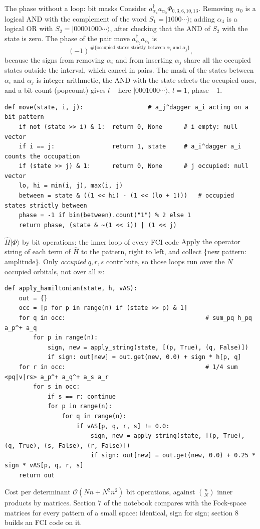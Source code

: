 \documentclass[aspectratio=169,10pt]{beamer}
\newcommand{\ket}[1]{\vert #1\rangle}
\begin{document}
\begin{frame}[fragile]{The phase without a loop: bit masks}
  \small
  Consider $a^{\dagger}_{\alpha_4}a_{\alpha_0}\Phi_{0,3,6,10,13}$. Removing $\alpha_0$ is a logical AND with the complement of the word $S_1=\ket{1000\cdots}$; adding $\alpha_4$ is a logical OR with $S_2=\ket{00001000\cdots}$, after checking that the AND of $S_2$ with the state is zero. The phase of the pair move $a^{\dagger}_{\alpha_j}a_{\alpha_i}$ is
  \[
    (-1)^{\,\#\{\text{occupied states strictly between }\alpha_i\text{ and }\alpha_j\}},
  \]
  because the signs from removing $\alpha_i$ and from inserting $\alpha_j$ share all the occupied states outside the interval, which cancel in pairs. The mask of the states between $\alpha_i$ and $\alpha_j$ is integer arithmetic, the AND with the state selects the occupied ones, and a \alert{bit-count} (popcount) gives $l$ -- here $\ket{0001000\cdots}$, $l=1$, phase $-1$.
\begin{lstlisting}
def move(state, i, j):                  # a_j^dagger a_i acting on a bit pattern
    if not (state >> i) & 1:  return 0, None      # i empty: null vector
    if i == j:                return 1, state     # a_i^dagger a_i counts the occupation
    if (state >> j) & 1:      return 0, None      # j occupied: null vector
    lo, hi = min(i, j), max(i, j)
    between = state & ((1 << hi) - (1 << (lo + 1)))   # occupied states strictly between
    phase = -1 if bin(between).count("1") % 2 else 1
    return phase, (state & ~(1 << i)) | (1 << j)
\end{lstlisting}
\end{frame}

\begin{frame}[fragile]{$\hat{H}\ket{\Phi}$ by bit operations: the inner loop of every FCI code}
  \small
  Apply the operator string of each term of $\hat{H}$ to the pattern, right to left, and collect \{new pattern: amplitude\}. Only \emph{occupied} $q,r,s$ contribute, so those loops run over the $N$ occupied orbitals, not over all $n$:
\begin{lstlisting}
def apply_hamiltonian(state, h, vAS):
    out = {}
    occ = [p for p in range(n) if (state >> p) & 1]
    for q in occ:                                       # sum_pq h_pq a_p^+ a_q
        for p in range(n):
            sign, new = apply_string(state, [(p, True), (q, False)])
            if sign: out[new] = out.get(new, 0.0) + sign * h[p, q]
    for r in occ:                                       # 1/4 sum <pq|v|rs> a_p^+ a_q^+ a_s a_r
        for s in occ:
            if s == r: continue
            for p in range(n):
                for q in range(n):
                    if vAS[p, q, r, s] != 0.0:
                        sign, new = apply_string(state, [(p, True), (q, True), (s, False), (r, False)])
                        if sign: out[new] = out.get(new, 0.0) + 0.25 * sign * vAS[p, q, r, s]
    return out
\end{lstlisting}
  Cost per determinant $\mathcal{O}(Nn+N^2n^2)$ bit operations, against $\binom{n}{N}$ inner products by matrices. Section 7 of the notebook compares with the Fock-space matrices for every pattern of a small space: identical, sign for sign; section 8 builds an FCI code on it.
\end{frame}
\end{document}
